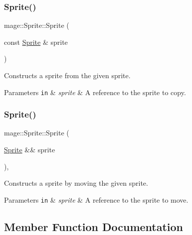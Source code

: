 \subsubsection{\texorpdfstring{Sprite()}{Sprite()}\hspace{0.1cm}{\footnotesize\ttfamily [2/3]}}
{\footnotesize\ttfamily mage\+::\+Sprite\+::\+Sprite (\begin{DoxyParamCaption}\item[{const \hyperlink{classmage_1_1_sprite}{Sprite} \&}]{sprite }\end{DoxyParamCaption})\hspace{0.3cm}{\ttfamily [protected]}}

Constructs a sprite from the given sprite.


\begin{DoxyParams}[1]{Parameters}
\mbox{\tt in}  & {\em sprite} & A reference to the sprite to copy. \\
\hline
\end{DoxyParams}
\hypertarget{classmage_1_1_sprite_a84d01e440d0a8105d45a3e18a0698d07}{}\label{classmage_1_1_sprite_a84d01e440d0a8105d45a3e18a0698d07} 
\subsubsection{\texorpdfstring{Sprite()}{Sprite()}\hspace{0.1cm}{\footnotesize\ttfamily [3/3]}}
{\footnotesize\ttfamily mage\+::\+Sprite\+::\+Sprite (\begin{DoxyParamCaption}\item[{\hyperlink{classmage_1_1_sprite}{Sprite} \&\&}]{sprite }\end{DoxyParamCaption})\hspace{0.3cm}{\ttfamily [protected]}, {\ttfamily [default]}}

Constructs a sprite by moving the given sprite.


\begin{DoxyParams}[1]{Parameters}
\mbox{\tt in}  & {\em sprite} & A reference to the sprite to move. \\
\hline
\end{DoxyParams}


\subsection{Member Function Documentation}
\hypertarget{classmage_1_1_sprite_a66e27a8a98ac5a4289e8440ef8193718}{}\label{classmage_1_1_sprite_a66e27a8a98ac5a4289e8440ef8193718} 

